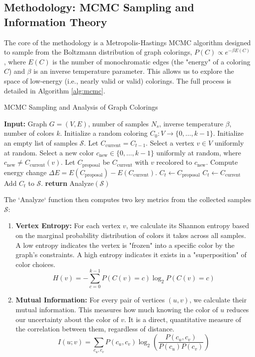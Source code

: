 \documentclass[12pt, letterpaper]{article}
\begin{document}
\subsection{Methodology: MCMC Sampling and Information Theory}
The core of the methodology is a Metropolis-Hastings MCMC algorithm designed to sample from the Boltzmann distribution of graph colorings, $P(C) \propto e^{-\beta E(C)}$, where $E(C)$ is the number of monochromatic edges (the "energy" of a coloring $C$) and $\beta$ is an inverse temperature parameter. This allows us to explore the space of low-energy (i.e., nearly valid or valid) colorings. The full process is detailed in Algorithm \ref{alg:mcmc}.

\begin{algorithm}
\caption{MCMC Sampling and Analysis of Graph Colorings}
\label{alg:mcmc}
\begin{algorithmic}[1]
\State \textbf{Input:} Graph $G=(V,E)$, number of samples $N_s$, inverse temperature $\beta$, number of colors $k$.
\State Initialize a random coloring $C_0: V \to \{0, \ldots, k-1\}$.
\State Initialize an empty list of samples $\mathcal{S}$.
    \State Let $C_{\text{current}} = C_{t-1}$.
    \State Select a vertex $v \in V$ uniformly at random.
    \State Select a new color $c_{\text{new}} \in \{0, \ldots, k-1\}$ uniformly at random, where $c_{\text{new}} \neq C_{\text{current}}(v)$.
    \State Let $C_{\text{proposal}}$ be $C_{\text{current}}$ with $v$ recolored to $c_{\text{new}}$.
    \State Compute energy change $\Delta E = E(C_{\text{proposal}}) - E(C_{\text{current}})$.
        \State $C_t \leftarrow C_{\text{proposal}}$ 
    \Else
        \State $C_t \leftarrow C_{\text{current}}$ 
    \EndIf
    \State Add $C_t$ to $\mathcal{S}$.
\EndFor
\State \textbf{return} Analyze$(\mathcal{S})$
\end{algorithmic}
\end{algorithm}

The `Analyze` function then computes two key metrics from the collected samples $\mathcal{S}$:
\begin{enumerate}
    \item \textbf{Vertex Entropy:} For each vertex $v$, we calculate its Shannon entropy based on the marginal probability distribution of colors it takes across all samples. A low entropy indicates the vertex is "frozen" into a specific color by the graph's constraints. A high entropy indicates it exists in a "superposition" of color choices.
    $$ H(v) = -\sum_{c=0}^{k-1} P(C(v)=c) \log_2 P(C(v)=c) $$
    \item \textbf{Mutual Information:} For every pair of vertices $(u, v)$, we calculate their mutual information. This measures how much knowing the color of $u$ reduces our uncertainty about the color of $v$. It is a direct, quantitative measure of the correlation between them, regardless of distance.
    $$ I(u; v) = \sum_{c_u, c_v} P(c_u, c_v) \log_2\left(\frac{P(c_u, c_v)}{P(c_u)P(c_v)}\right) $$
\end{enumerate}
\end{document}
